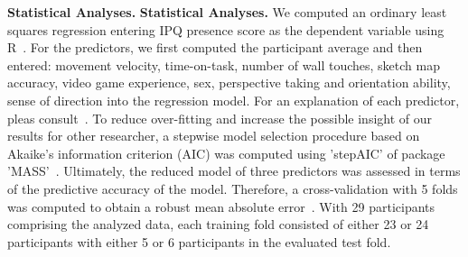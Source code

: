 \indent \textbf{Statistical Analyses.}
\indent \textbf{Statistical Analyses.} We computed an ordinary least squares regression entering IPQ presence score as the dependent variable using R~\cite{rver}. For the predictors, we first computed the participant average and then entered: movement velocity, time-on-task, number of wall touches, sketch map accuracy, video game experience, sex, perspective taking and orientation ability, sense of direction into the regression model. For an explanation of each predictor, pleas consult~\cite{gehrke2018}. To reduce over-fitting and increase the possible insight of our results for other researcher, a stepwise model selection procedure based on Akaike's information criterion (AIC) was computed using 'stepAIC' of package 'MASS'~\cite{aic, mass}.
Ultimately, the reduced model of three predictors was assessed in terms of the predictive accuracy of the model. Therefore, a cross-validation with 5 folds was computed to obtain a robust mean absolute error~\cite{cv, mae}. With 29 participants comprising the analyzed data, each training fold consisted of either 23 or 24 participants with either 5 or 6 participants in the evaluated test fold.

